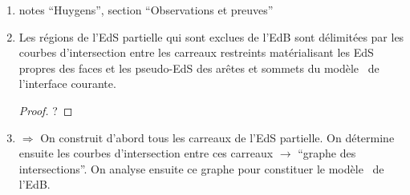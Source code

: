 \begin{enumerate}
	\item \cf notes ``Huygens'', section ``Observations et preuves''
	
	\item Les régions de l'EdS partielle qui sont exclues de l'EdB sont délimitées par les courbes d'intersection entre les carreaux restreints matérialisant les EdS propres des faces et les pseudo-EdS des arêtes et sommets du modèle \brep\ de l'interface courante. 
	\begin{proof}
		?
	\end{proof}
	
	
	\item $\Rightarrow$ On construit d'abord tous les carreaux de l'EdS partielle. On détermine ensuite les courbes d'intersection entre ces carreaux $\to$ ``graphe des intersections''. On analyse ensuite ce graphe pour constituer le modèle \brep\ de l'EdB.
\end{enumerate}

